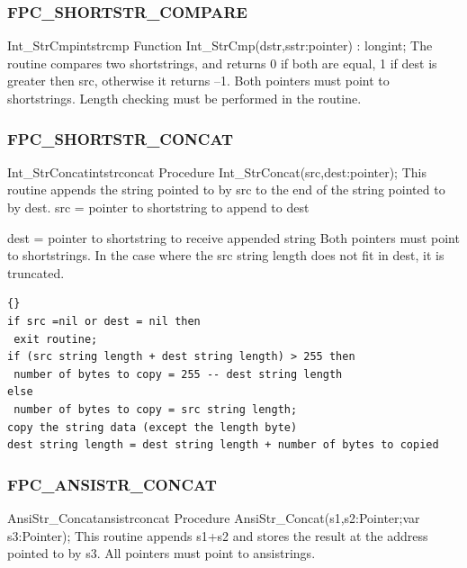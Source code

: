 \documentclass [a4paper,12pt]{article}
\begin{document}
\subsubsection{FPC{\_}SHORTSTR{\_}COMPARE}
\label{subsubsec:mylabel37}

\begin{functionl}{Int{\_}StrCmp}{intstrcmp}
\Declaration
Function Int{\_}StrCmp(dstr,sstr:pointer) : longint;
\Description
The routine compares two shortstrings, and returns 0 if both are equal, 1 if
\textsf{dest} is greater then \textsf{src}, otherwise it returns --1.
\Notes
Both pointers must point to shortstrings. Length checking must be performed
in the routine.
\end{functionl}

\subsubsection{FPC{\_}SHORTSTR{\_}CONCAT}
\label{subsubsec:mylabel38}

\begin{procedurel}{Int{\_}StrConcat}{intstrconcat}
\Declaration
Procedure Int{\_}StrConcat(src,dest:pointer);
\Description
This routine appends the string pointed to by \textsf{src} to the end of the
string pointed to by \textsf{dest}.
\Parameters
src  = pointer to shortstring to append to dest \par
dest = pointer to shortstring to receive appended string
\Notes
Both pointers must point to shortstrings. In the case where the src string
length does not fit in dest, it is truncated.
\Algorithm
\begin{lstlisting}{}
if src =nil or dest = nil then 
 exit routine;
if (src string length + dest string length) > 255 then
 number of bytes to copy = 255 -- dest string length
else
 number of bytes to copy = src string length;
copy the string data (except the length byte)
dest string length = dest string length + number of bytes to copied
\end{lstlisting}
\end{procedurel}

\subsubsection{FPC{\_}ANSISTR{\_}CONCAT}
\label{subsubsec:mylabel39}

\begin{procedurel}{AnsiStr{\_}Concat}{ansistrconcat}
\Declaration
Procedure AnsiStr{\_}Concat(s1,s2:Pointer;var s3:Pointer);
\Description
This routine appends \textsf{s1}+\textsf{s2} and stores the result at the
address pointed to by \textsf{s3}.
\Notes
All pointers must point to ansistrings. 
\end{procedurel}
\end{document}
